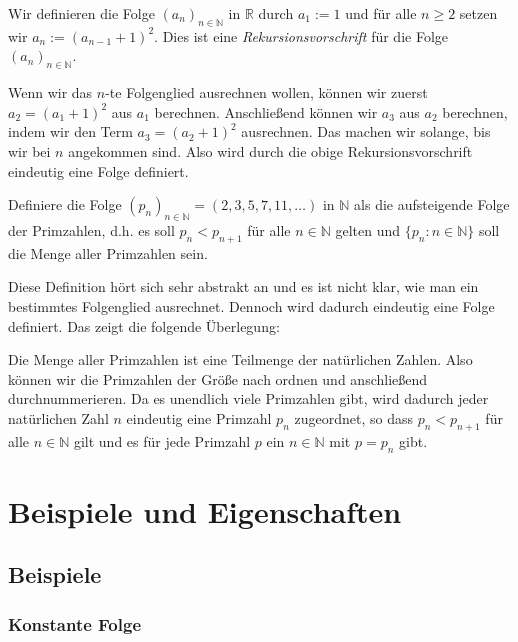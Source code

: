 \documentclass[fontsize=9pt,
               parskip=half-,
               DIV=14,
               listof=chapterentry,
               tocflat]{scrbook}
\begin{document}
\begin{example*}
Wir definieren die Folge $(a_{n})_{n\in \mathbb {N} }$ in $\mathbb {R} $ durch $a_{1}:=1$ und für alle $n\geq 2$ setzen wir $a_{n}:=(a_{n-1}+1)^{2}$. Dies ist eine \emph{Rekursionsvorschrift} für die Folge $(a_{n})_{n\in \mathbb {N} }$.

Wenn wir das $n$-te Folgenglied ausrechnen wollen, können wir zuerst $a_{2}=(a_{1}+1)^{2}$ aus $a_{1}$ berechnen. Anschließend können wir $a_{3}$ aus $a_{2}$ berechnen, indem wir den Term $a_{3}=(a_{2}+1)^{2}$ ausrechnen. Das machen wir solange, bis wir bei $n$ angekommen sind. Also wird durch die obige Rekursionsvorschrift eindeutig eine Folge definiert.

\end{example*}

\begin{example*}
Definiere die Folge $(p_{n})_{n\in \mathbb {N} }=(2,3,5,7,11,\ldots )$ in $\mathbb {N} $ als die aufsteigende Folge der Primzahlen, d.h. es soll $p_{n}<p_{n+1}$ für alle $n\in \mathbb {N} $ gelten und $\{p_{n}:n\in \mathbb {N} \}$ soll die Menge aller Primzahlen sein.

Diese Definition hört sich sehr abstrakt an und es ist nicht klar, wie man ein bestimmtes Folgenglied ausrechnet. Dennoch wird dadurch eindeutig eine Folge definiert. Das zeigt die folgende Überlegung:

Die Menge aller Primzahlen ist eine Teilmenge der natürlichen Zahlen. Also können wir die Primzahlen der Größe nach ordnen und anschließend durchnummerieren. Da es unendlich viele Primzahlen gibt, wird dadurch jeder natürlichen Zahl $n$ eindeutig eine Primzahl $p_{n}$ zugeordnet, so dass $p_{n}<p_{n+1}$ für alle $n\in \mathbb {N} $ gilt und es für jede Primzahl $p$ ein $n\in \mathbb {N} $ mit $p=p_{n}$ gibt.

\end{example*}

\chapter{Beispiele und Eigenschaften}

\section{Beispiele}

\subsection{Konstante Folge}
\end{document}

